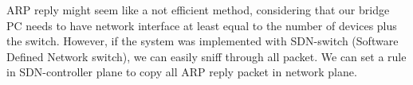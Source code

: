 ARP reply might seem like a not efficient method, considering that our bridge PC needs to have network interface at least equal to the number of devices plus the switch. However, if the system was implemented with SDN-switch (Software Defined Network switch), we can easily sniff through all packet. We can set a rule in SDN-controller plane to copy all ARP reply packet in network plane.